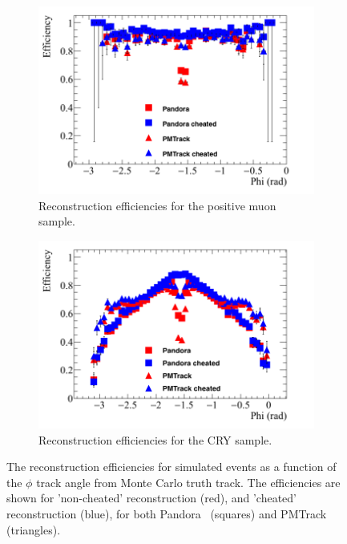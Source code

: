 \begin{figure}
  \centering
  \begin{subfigure}{0.48\textwidth}
    \centering
    \includegraphics[width=\textwidth]{Effic_AntiMuon_500V_All_Phi}
    \caption{Reconstruction efficiencies for the positive muon sample.}
    \label{fig:SimEffic_Phi_AMu}
  \end{subfigure}%
  \hspace{0.03\textwidth}%
  \begin{subfigure}{0.48\textwidth}
    \centering
    \includegraphics[width=\textwidth]{Effic_Cosmics_500V_All_Phi}
    \caption{Reconstruction efficiencies for the CRY sample.}
    \label{fig:SimEffic_Phi_CRY}
  \end{subfigure}
  \caption[The reconstruction efficiencies for simulated events as a function of the $\phi$ track angle from Monte Carlo truth track.]
          {The reconstruction efficiencies for simulated events as a function of the $\phi$ track angle from Monte Carlo truth track. The efficiencies are shown for 'non-cheated' reconstruction (red), and 'cheated' reconstruction (blue), for both Pandora~\citep{Pandora} (squares) and PMTrack~\citep{PMTrack} (triangles).}
          \label{fig:SimEffic_Phi}
\end{figure}

